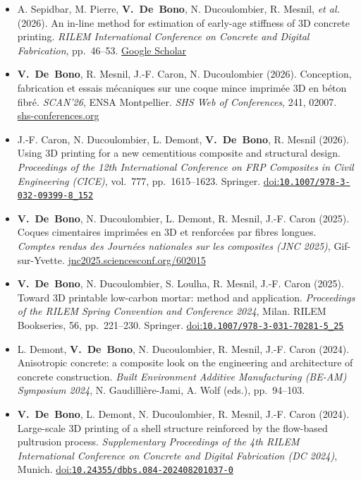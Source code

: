 \documentclass[11pt,a4paper]{article}
\newcommand{\doi}[1]{\href{https://doi.org/#1}{doi:\nolinkurl{#1}}}
\newcommand{\me}{\textbf{V.~De~Bono}}
\newenvironment{publis}[1]%
  {\begin{itemize}[label={}, leftmargin=1.2em, labelwidth=0pt, labelsep=0pt,
     itemindent=-1.2em, itemsep=0.45em, topsep=0.3em]}%
  {\end{itemize}}
\begin{document}
\begin{publis}{C}
  \item A. Sepidbar, M. Pierre, \me, N. Ducoulombier, R. Mesnil, \emph{et al.} (2026).
  An in-line method for estimation of early-age stiffness of 3D concrete printing.
  \emph{RILEM International Conference on Concrete and Digital Fabrication}, pp.~46--53.
  \href{https://scholar.google.com/scholar?q=An+In-line+Method+for+Estimation+of+Early-Age+Stiffness+of+3D+Concrete+Printing}{Google Scholar}

  \item \me, R. Mesnil, J.-F. Caron, N. Ducoulombier (2026).
  Conception, fabrication et essais mécaniques sur une coque mince imprimée 3D en béton fibré.
  \emph{SCAN'26}, ENSA Montpellier. \emph{SHS Web of Conferences}, 241, 02007.
  \href{https://www.shs-conferences.org/articles/shsconf/abs/2026/15/shsconf_scan26_02007/shsconf_scan26_02007.html}{shs-conferences.org}

  \item J.-F. Caron, N. Ducoulombier, L. Demont, \me, R. Mesnil (2026).
  Using 3D printing for a new cementitious composite and structural design.
  \emph{Proceedings of the 12th International Conference on FRP Composites in Civil Engineering (CICE)}, vol.~777, pp.~1615--1623. Springer.
  \doi{10.1007/978-3-032-09399-8_152}

  \item \me, N. Ducoulombier, L. Demont, R. Mesnil, J.-F. Caron (2025).
  Coques cimentaires imprimées en 3D et renforcées par fibres longues.
  \emph{Comptes rendus des Journées nationales sur les composites (JNC 2025)}, Gif-sur-Yvette.
  \href{https://jnc2025.sciencesconf.org/602015/document}{jnc2025.sciencesconf.org/602015}

  \item \me, N. Ducoulombier, S. Loulha, R. Mesnil, J.-F. Caron (2025).
  Toward 3D printable low-carbon mortar: method and application.
  \emph{Proceedings of the RILEM Spring Convention and Conference 2024}, Milan. RILEM Bookseries, 56, pp.~221--230. Springer.
  \doi{10.1007/978-3-031-70281-5_25}

  \item L. Demont, \me, N. Ducoulombier, R. Mesnil, J.-F. Caron (2024).
  Anisotropic concrete: a composite look on the engineering and architecture of concrete construction.
  \emph{Built Environment Additive Manufacturing (BE-AM) Symposium 2024}, N. Gaudillière-Jami, A. Wolf (eds.), pp.~94--103.

  \item \me, L. Demont, N. Ducoulombier, R. Mesnil, J.-F. Caron (2024).
  Large-scale 3D printing of a shell structure reinforced by the flow-based pultrusion process.
  \emph{Supplementary Proceedings of the 4th RILEM International Conference on Concrete and Digital Fabrication (DC 2024)}, Munich.
  \doi{10.24355/dbbs.084-202408201037-0}


\end{publis}
\end{document}
